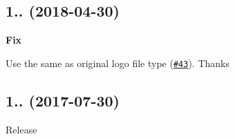 \subsection*{1.. (2018-\/04-\/30)}


\begin{DoxyItemize}
\item {\bfseries Fix}
\begin{DoxyItemize}
\item Use the same as original logo file type (\href{https://github.com/esdoc/esdoc-plugins/pull/43}{\tt \#43}). Thanks \href{https://github.com/bencevans}{\tt }
\end{DoxyItemize}
\end{DoxyItemize}

\subsection*{1.. (2017-\/07-\/30)}


\begin{DoxyItemize}
\item Release 
\end{DoxyItemize}
